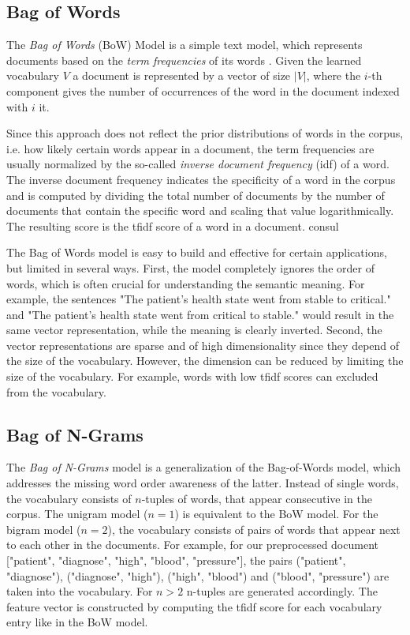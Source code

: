\subsection{Bag of Words}

The \textit{Bag of Words} (BoW) Model is a simple text model, which represents documents based on the \textit{term frequencies} of its words \cite{harris1954distributional}.
Given the learned vocabulary $V$ a document is represented by a vector of size $|V|$, where the $i$-th component gives the number of occurrences of the word in the document indexed with $i$ it.

Since this approach does not reflect the prior distributions of words in the corpus, i.e. how likely certain words appear in a document, the term frequencies are usually normalized by the so-called \textit{inverse document frequency} (idf) of a word.
The inverse document frequency indicates the specificity of a word in the corpus and is computed by dividing the total number of documents by the number of documents that contain the specific word and scaling that value logarithmically.
The resulting score is the tfidf score of a word in a document.
 consul

The Bag of Words model is easy to build and effective for certain applications, but limited in several ways.
First, the model completely ignores the order of words, which is often crucial for understanding the semantic meaning. For example, the sentences "The patient's health state went from stable to critical." and "The patient's health state went from critical to stable." would result in the same vector representation, while the meaning is clearly inverted.
Second, the vector representations are sparse and of high dimensionality since they depend of the size of the vocabulary.
However, the dimension can be reduced by limiting the size of the vocabulary. For example, words with low tfidf scores can excluded from the vocabulary.


\subsection{Bag of N-Grams}

The \textit{Bag of N-Grams} model is a generalization of the Bag-of-Words model, which addresses the missing word order awareness of the latter.
Instead of single words, the vocabulary consists of $n$-tuples of words, that appear consecutive in the corpus.
The unigram model ($n=1$) is equivalent to the BoW model.
For the bigram model ($n=2$), the vocabulary consists of pairs of words that appear next to each other in the documents.
For example, for our preprocessed document ["patient", "diagnose", "high", "blood", "pressure"], the pairs ("patient", "diagnose"), ("diagnose", "high"), ("high", "blood") and ("blood", "pressure") are taken into the vocabulary.
For $n>2$ n-tuples are generated accordingly.
The feature vector is constructed by computing the tfidf score for each vocabulary entry like in the BoW model.

